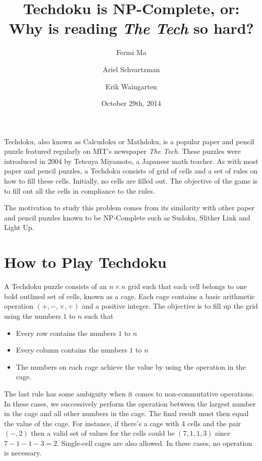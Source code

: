 \documentclass[runningheads,a4paper]{llncs}
\date{October 29th, 2014}							%
\begin{document}
\title{Techdoku is NP-Complete, or: Why is reading \textit{The Tech} so hard?}

\author{Fermi Ma \and Ariel Schvartzman \and Erik Waingarten}
%


\maketitle

Techdoku, also known as Calcudoku or Mathdoku, is a popular paper and pencil puzzle featured regularly on MIT's newspaper \textit{The Tech}. These puzzles were introduced in 2004 by Tetsuya Miyamoto, a Japanese math teacher. As with most paper and pencil puzzles, a Techdoku consists of grid of cells and a set of rules on how to fill these cells. Initially, no cells are filled out. The objective of the game is to fill out all the cells in compliance to the rules. 

The motivation to study this problem comes from its similarity with other paper and pencil puzzles known to be NP-Complete such as Sudoku, Slither Link and Light Up. 

\section{How to Play Techdoku}

A Techdoku puzzle consists of an $n \times n$ grid such that each cell belongs to one bold outlined set of cells, known as a cage. Each cage contains a basic arithmetic operation $(+, - , \times, \div )$ and a positive integer. The objective is to fill up the grid using the numbers $1$ to $n$ such that 

\begin{itemize}
	\item Every row contains the numbers $1$ to $n$
	\item Every column contains the numbers $1$ to $n$
	\item The numbers on each cage achieve the value by using the operation in the cage. 
\end{itemize}

The last rule has some ambiguity when it comes to non-commutative operations. In these cases, we successively perform the operation between the largest number in the cage and all other numbers in the cage. The final result must then equal the value of the cage. For instance, if there's a cage with 4 cells and the pair $(-, 2)$ then a valid set of values for the cells could be $(7, 1, 1, 3)$ since $7 - 1 - 1 - 3 = 2$. Single-cell cages are also allowed. In these cases, no operation is necessary. 
\end{document}
